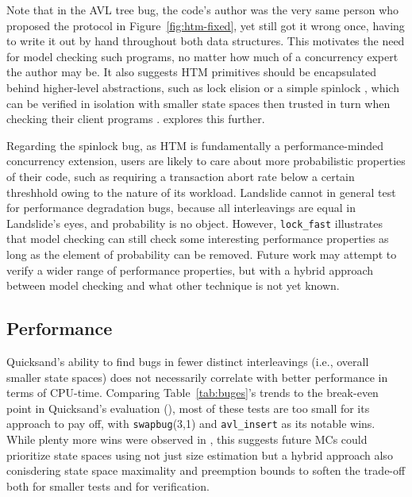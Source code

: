 Note that in the AVL tree bug,
the code's author was the very same person who proposed the protocol in Figure~\ref{fig:htm-fixed},
yet still got it wrong once, having to write it out by hand throughout both data structures.
This motivates the need for model checking such programs,
no matter how much of a concurrency expert the author may be.
It also suggests HTM primitives should be encapsulated behind higher-level abstractions,
such as lock elision \cite{lock-elision}
or a simple spinlock \cite{spinlock-rtm-github},
which can be verified in isolation with smaller state spaces
then trusted in turn when checking their client programs \cite{dbug-phdthesis}.
\sect{\ref{sec:tm-verif}} explores this further.

Regarding the spinlock bug,
as HTM is fundamentally a performance-minded concurrency extension,
users are likely to care about more probabilistic properties of their code,
such as requiring a transaction abort rate below a certain threshhold
owing to the nature of its workload.
Landslide cannot in general test for performance degradation bugs,
because all interleavings are equal in Landslide's eyes, and probability is no object.
However, {\tt lock\_fast} illustrates that model checking can still check some interesting performance properties
as long as the element of probability can be removed.
Future work may attempt to verify a wider range of performance properties,
but with a hybrid approach between model checking and what other technique is not yet known.

\subsection{Performance}

Quicksand's ability to find bugs in fewer distinct interleavings (i.e., overall smaller state spaces)
does not necessarily correlate with better performance in terms of CPU-time.
Comparing Table~\ref{tab:buges}'s trends
to the break-even point in Quicksand's evaluation (\sect{\ref{sec:quicksand-eval}}),
most of these tests are too small for its approach to pay off,
with {\tt swapbug}(3,1) and {\tt avl\_insert} as its notable wins.
While plenty more wins were observed in \sect{\ref{sec:quicksand-eval}},
this suggests
future MCs could prioritize state spaces using not just size estimation
but a hybrid approach also conisdering state space maximality and preemption bounds \cite{chess-icb}
to soften the trade-off
both for smaller tests and for verification.

